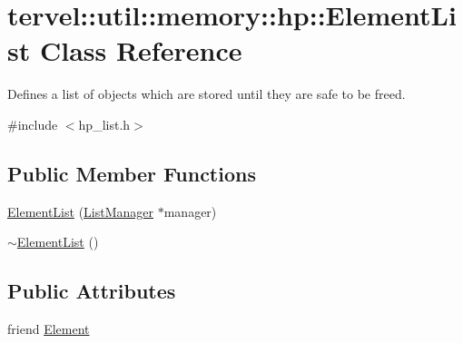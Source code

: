 \hypertarget{classtervel_1_1util_1_1memory_1_1hp_1_1_element_list}{}\section{tervel\+:\+:util\+:\+:memory\+:\+:hp\+:\+:Element\+List Class Reference}
\label{classtervel_1_1util_1_1memory_1_1hp_1_1_element_list}


Defines a list of objects which are stored until they are safe to be freed.  




{\ttfamily \#include $<$hp\+\_\+list.\+h$>$}

\subsection*{Public Member Functions}
\begin{DoxyCompactItemize}
\item 
\hyperlink{classtervel_1_1util_1_1memory_1_1hp_1_1_element_list_a08f1ad218521948919aa8232098d69fb}{Element\+List} (\hyperlink{classtervel_1_1util_1_1memory_1_1hp_1_1_list_manager}{List\+Manager} $\ast$manager)
\item 
\hyperlink{classtervel_1_1util_1_1memory_1_1hp_1_1_element_list_a4ca58faad54530a724b61dfc5dc2f73b}{$\sim$\+Element\+List} ()
\end{DoxyCompactItemize}
\subsection*{Public Attributes}
\begin{DoxyCompactItemize}
\item 
friend \hyperlink{classtervel_1_1util_1_1memory_1_1hp_1_1_element_list_a2392e8dcf3dc26d7766c92a875696649}{Element}
\end{DoxyCompactItemize}

